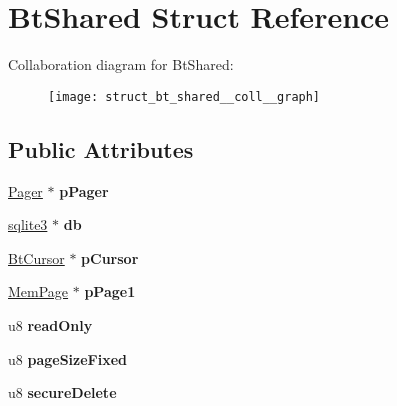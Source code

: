 \hypertarget{struct_bt_shared}{\section{Bt\-Shared Struct Reference}
\label{struct_bt_shared}
}


Collaboration diagram for Bt\-Shared\-:\nopagebreak
\begin{figure}[H]
\begin{center}
\leavevmode
\texttt{[image: struct\_bt\_shared\_\_coll\_\_graph]}
\end{center}
\end{figure}
\subsection*{Public Attributes}
\begin{DoxyCompactItemize}
\item 
\hypertarget{struct_bt_shared_ab79703fc47a16446274457588d7eb989}{\hyperlink{struct_pager}{Pager} $\ast$ {\bfseries p\-Pager}}\label{struct_bt_shared_ab79703fc47a16446274457588d7eb989}

\item 
\hypertarget{struct_bt_shared_a93dafa672793f6117a336d5987951c8e}{\hyperlink{structsqlite3}{sqlite3} $\ast$ {\bfseries db}}\label{struct_bt_shared_a93dafa672793f6117a336d5987951c8e}

\item 
\hypertarget{struct_bt_shared_a8f8b52dee390e5606e8e2a8511530de7}{\hyperlink{struct_bt_cursor}{Bt\-Cursor} $\ast$ {\bfseries p\-Cursor}}\label{struct_bt_shared_a8f8b52dee390e5606e8e2a8511530de7}

\item 
\hypertarget{struct_bt_shared_a296dffd1c698ec175fee109718f32d5d}{\hyperlink{struct_mem_page}{Mem\-Page} $\ast$ {\bfseries p\-Page1}}\label{struct_bt_shared_a296dffd1c698ec175fee109718f32d5d}

\item 
\hypertarget{struct_bt_shared_ac8e55afc249f7ffa3d0f5dd5637d3825}{u8 {\bfseries read\-Only}}\label{struct_bt_shared_ac8e55afc249f7ffa3d0f5dd5637d3825}

\item 
\hypertarget{struct_bt_shared_a0e728415ef91a26a8a1c6c9a6a9d8cd0}{u8 {\bfseries page\-Size\-Fixed}}\label{struct_bt_shared_a0e728415ef91a26a8a1c6c9a6a9d8cd0}

\item 
\hypertarget{struct_bt_shared_af8fe491f61d5c4be043dc19aa0bda0c4}{u8 {\bfseries secure\-Delete}}\label{struct_bt_shared_af8fe491f61d5c4be043dc19aa0bda0c4}


\end{DoxyCompactItemize}

